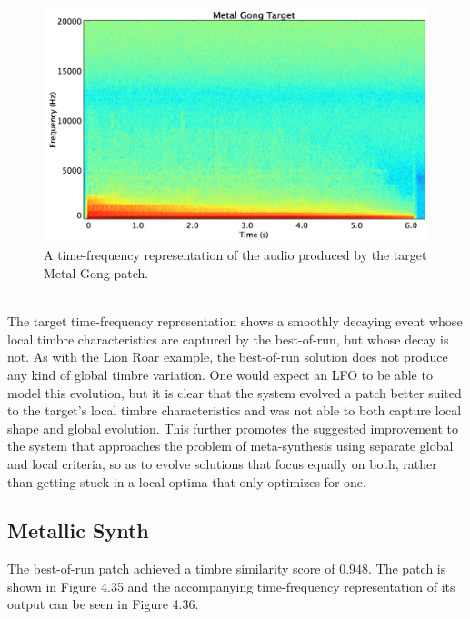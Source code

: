\documentclass[a4paper,12pt]{report} 	%
\numberwithin{figure}{chapter}
\numberwithin{table}{chapter}
\numberwithin{equation}{chapter}
\begin{document}
\begin{flushleft}
\begin{figure}[h!]
\begin{center}
\includegraphics[scale=0.35,width=\linewidth]{MetalGongTargetSTFT}
\caption[Target Metal Gong Time-Frequency Representation]{A time-frequency representation of the audio produced by the target Metal Gong patch.}
\end{center}
\end{figure}
\\
The target time-frequency representation shows a smoothly decaying event whose local timbre characteristics are captured by the best-of-run, but whose decay is not. As with the Lion Roar example, the best-of-run solution does not produce any kind of global timbre variation. One would expect an LFO to be able to model this evolution, but it is clear that the system evolved a patch better suited to the target's local timbre characteristics and was not able to both capture local shape and global evolution. This further promotes the suggested improvement to the system that approaches the problem of meta-synthesis using separate global and local criteria, so as to evolve solutions that focus equally on both, rather than getting stuck in a local optima that only optimizes for one.

\clearpage
\subsection{Metallic Synth}

The best-of-run patch achieved a timbre similarity score of $0.948$. The patch is shown in Figure 4.35 and the accompanying time-frequency representation of its output can be seen in Figure 4.36.


\end{flushleft}
\end{document}
